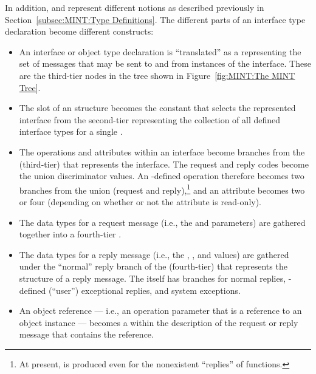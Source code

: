 In addition,  and  represent different
notions as described previously in Section~\ref{subsec:MINT:Type Definitions}.
The different parts of an \AOI{} interface type declaration become different
\MINT{} constructs:

\begin{itemize}
  \item An interface or object type declaration is ``translated'' as a
   representing the set of messages that may be sent to and
  from instances of the interface.  These are the third-tier nodes in the
  \MINT{} tree shown in Figure~\ref{fig:MINT:The MINT Tree}.

  \item The  slot of an  structure becomes the
  \MINT{} constant that selects the represented interface from the second-tier
   representing the collection of all defined interface types
  for a single \IDL{}\@.

  \item The operations and attributes within an \AOI{} interface become
  branches from the (third-tier)  that represents the
  interface.  The request and reply codes become the union discriminator
  values.  An \AOI{}-defined operation therefore becomes two branches from the
  union (request and reply),\footnote{At present, \MINT{} is produced even for
  the nonexistent ``replies'' of  functions.} and an attribute
  becomes two or four (depending on whether or not the attribute is read-only).

  \item The data types for a request message (i.e., the  and
   parameters) are gathered together into a fourth-tier
  .

  \item The data types for a reply message (i.e., the , ,
  and  values) are gathered under the ``normal'' reply branch of
  the (fourth-tier)  that represents the structure of a reply
  message.  The  itself has branches for normal replies,
  \IDL{}-defined (``user'') exceptional replies, and system exceptions.

  \item An object reference --- i.e., an operation parameter that is a
  reference to an object instance --- becomes a  within the
  description of the request or reply message that contains the reference.
\end{itemize}

